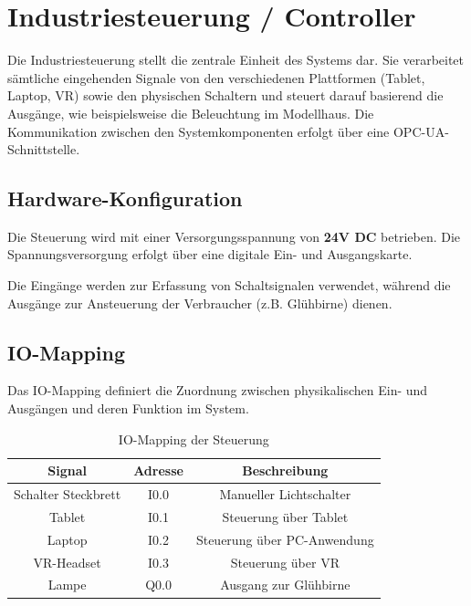 \section{Industriesteuerung / Controller}

Die Industriesteuerung stellt die zentrale Einheit des Systems dar. 
Sie verarbeitet sämtliche eingehenden Signale von den verschiedenen Plattformen (Tablet, Laptop, VR) sowie den physischen Schaltern und steuert darauf basierend die Ausgänge, wie beispielsweise die Beleuchtung im Modellhaus. 
Die Kommunikation zwischen den Systemkomponenten erfolgt über eine OPC-UA-Schnittstelle.

\subsection{Hardware-Konfiguration}

Die Steuerung wird mit einer Versorgungsspannung von \textbf{24V DC} betrieben. 
Die Spannungsversorgung erfolgt über eine digitale Ein- und Ausgangskarte.

Die Eingänge werden zur Erfassung von Schaltsignalen verwendet, während die Ausgänge zur Ansteuerung der Verbraucher (z.B. Glühbirne) dienen.


\subsection{IO-Mapping}

Das IO-Mapping definiert die Zuordnung zwischen physikalischen Ein- und Ausgängen und deren Funktion im System.

\begin{table}[h]
\centering
\begin{tabular}{|c|c|c|}
\hline
\textbf{Signal} & \textbf{Adresse} & \textbf{Beschreibung} \\
\hline
Schalter Steckbrett & I0.0 & Manueller Lichtschalter \\
Tablet & I0.1 & Steuerung über Tablet \\
Laptop & I0.2 & Steuerung über PC-Anwendung \\
VR-Headset & I0.3 & Steuerung über VR \\
\hline
Lampe & Q0.0 & Ausgang zur Glühbirne \\
\hline
\end{tabular}
\caption{IO-Mapping der Steuerung}
\end{table}

